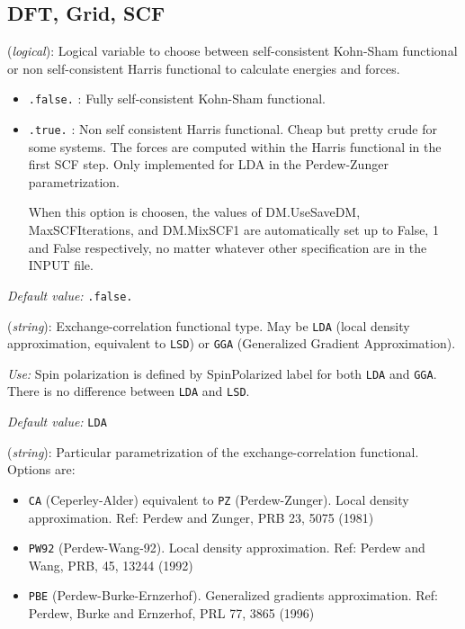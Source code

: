 \documentclass[11pt]{article}
\begin{document}
\vspace{5pt}
\subsection{DFT, Grid, SCF}

\begin{description}
\itemsep 10pt
\parsep 0pt

\item[{\bf Harris\_functional}] ({\it logical}): 
Logical variable to choose between self-consistent Kohn-Sham functional or
 non self-consistent Harris functional to calculate energies and forces. 
\begin{itemize}
\item {\tt .false.} : Fully self-consistent Kohn-Sham functional. 
\item {\tt .true.} : Non self consistent Harris functional. Cheap but
pretty crude for some systems. The forces are computed within the
Harris functional in the first SCF step. Only implemented for LDA in
the Perdew-Zunger parametrization.

When this option is choosen, the values of DM.UseSaveDM,
MaxSCFIterations, and DM.MixSCF1 are automatically set up to False, 1
and False respectively, no matter whatever other specification are in
the INPUT file.
\end{itemize}
    
{\it Default value:} {\tt .false.} 

\item[{\bf XC.functional}] ({\it string}): 
Exchange-correlation functional type. May be {\tt LDA} 
(local density approximation, equivalent to {\tt LSD}) or 
{\tt GGA} (Generalized Gradient Approximation). 

{\it Use:} Spin polarization is defined by SpinPolarized label for
both {\tt LDA} and {\tt GGA}. There is no difference between {\tt LDA}
and {\tt LSD}.

{\it Default value:} {\tt LDA}
        

\item[{\bf XC.authors}] ({\it string}): 
Particular parametrization of the
exchange-correlation functional. Options are:
\begin{itemize}
\item {\tt CA} (Ceperley-Alder) equivalent to {\tt PZ} (Perdew-Zunger).
Local density approximation.
Ref: Perdew and Zunger, PRB 23, 5075 (1981)
\item {\tt PW92} (Perdew-Wang-92). 
Local density approximation.
Ref: Perdew and Wang, PRB, 45, 13244 (1992)
\item {\tt PBE} (Perdew-Burke-Ernzerhof). Generalized gradients
approximation.  Ref: Perdew, Burke and Ernzerhof, PRL 77, 3865
(1996)
\end{itemize}


\end{description}
\end{document}
